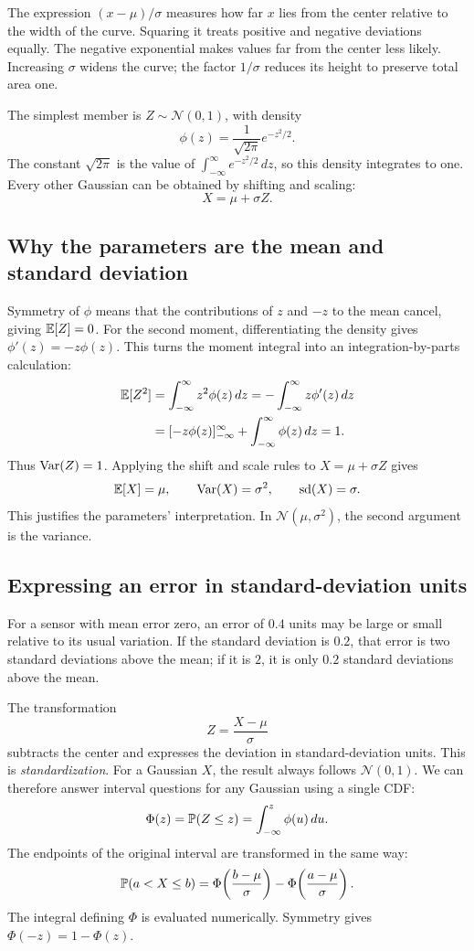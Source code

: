 The expression \((x-\mu)/\sigma\) measures how far \(x\) lies from the
center relative to the width of the curve. Squaring it treats positive
and negative deviations equally. The negative exponential makes values
far from the center less likely. Increasing \(\sigma\) widens the curve;
the factor \(1/\sigma\) reduces its height to preserve total area one.

The simplest member is \(Z\sim\mathcal N(0,1)\), with density
\[
  \phi(z)=\frac1{\sqrt{2\pi}}e^{-z^2/2}.
\]
The constant \(\sqrt{2\pi}\) is the value of
\(\int_{-\infty}^{\infty}e^{-z^2/2}\,dz\), so this density integrates to
one. Every other Gaussian can be obtained by shifting and scaling:
\[
  X=\mu+\sigma Z.
\]

\subsection{Why the parameters are the mean and standard deviation}

Symmetry of \(\phi\) means that the contributions of \(z\) and \(-z\)
to the mean cancel, giving \(\mathbb{E}[Z]=0\).
For the second moment, differentiating the density gives
\(\phi'(z)=-z\phi(z)\). This turns the moment integral into an
integration-by-parts calculation:
\begin{align*}
  \mathbb{E}[Z^2]
  &=\int_{-\infty}^{\infty}z^2\phi(z)\,dz
    =-\int_{-\infty}^{\infty}z\phi'(z)\,dz\\
  &=[-z\phi(z)]_{-\infty}^{\infty}
      +\int_{-\infty}^{\infty}\phi(z)\,dz
    =1.
\end{align*}
Thus \(\operatorname{Var}(Z)=1\). Applying the shift and scale rules to
\(X=\mu+\sigma Z\) gives
\[
  \mathbb{E}[X]=\mu,\qquad \operatorname{Var}(X)=\sigma^2,\qquad
  \operatorname{sd}(X)=\sigma.
\]
This justifies the parameters' interpretation.
In \(\mathcal N(\mu,\sigma^2)\), the second argument is the variance.

\subsection{Expressing an error in standard-deviation units}

For a sensor with mean error zero, an error of \(0.4\) units may be large
or small relative to its usual variation. If the standard deviation is
\(0.2\), that error is
two standard deviations above the mean; if it is \(2\), it is only
\(0.2\) standard deviations above the mean.

The transformation
\[
  Z=\frac{X-\mu}{\sigma}
\]
subtracts the center and expresses the deviation in standard-deviation
units. This is \emph{standardization}. For a Gaussian \(X\), the result
always follows \(\mathcal N(0,1)\). We can therefore answer interval
questions for any Gaussian using a single CDF:
\[
  \Phi(z)=\mathbb{P}(Z\le z)=\int_{-\infty}^z\phi(u)\,du.
\]
The endpoints of the original interval are transformed in the same way:
\[
  \mathbb{P}(a<X\le b)
  =\Phi\!\left(\frac{b-\mu}{\sigma}\right)
   -\Phi\!\left(\frac{a-\mu}{\sigma}\right).
\]
The integral defining \(\Phi\) is evaluated numerically. Symmetry gives
\(\Phi(-z)=1-\Phi(z)\).

